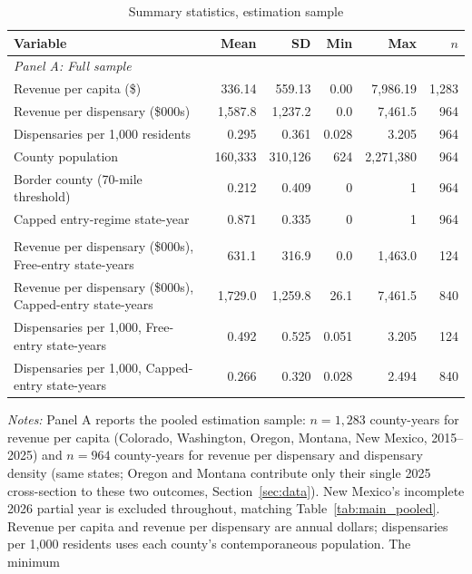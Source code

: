 \begin{table}[htbp]
\centering
\caption{Summary statistics, estimation sample}
\label{tab:summary_stats}
\begin{tabular}{lrrrrr}
\toprule
Variable & Mean & SD & Min & Max & $n$ \\
\midrule
\multicolumn{6}{l}{\textit{Panel A: Full sample}} \\
Revenue per capita (\$) & 336.14 & 559.13 & 0.00 & 7,986.19 & 1,283 \\
Revenue per dispensary (\$000s) & 1,587.8 & 1,237.2 & 0.0 & 7,461.5 & 964 \\
Dispensaries per 1,000 residents & 0.295 & 0.361 & 0.028 & 3.205 & 964 \\
County population & 160,333 & 310,126 & 624 & 2,271,380 & 964 \\
\addlinespace
Border county (70-mile threshold) & 0.212 & 0.409 & 0 & 1 & 964 \\
Capped entry-regime state-year & 0.871 & 0.335 & 0 & 1 & 964 \\
\addlinespace
\multicolumn{6}{l}{\textit{Panel B: By entry regime (revenue-per-store sample)}} \\
\quad Revenue per dispensary (\$000s), Free-entry state-years & 631.1 & 316.9 & 0.0 & 1,463.0 & 124 \\
\quad Revenue per dispensary (\$000s), Capped-entry state-years & 1,729.0 & 1,259.8 & 26.1 & 7,461.5 & 840 \\
\quad Dispensaries per 1,000, Free-entry state-years & 0.492 & 0.525 & 0.051 & 3.205 & 124 \\
\quad Dispensaries per 1,000, Capped-entry state-years & 0.266 & 0.320 & 0.028 & 2.494 & 840 \\
\bottomrule
\end{tabular}
\begin{minipage}{0.95\textwidth}
\vspace{0.4em}
\footnotesize
\textit{Notes:} Panel A reports the pooled estimation sample: $n=1{,}283$ county-years for revenue per
capita (Colorado, Washington, Oregon, Montana, New Mexico, 2015--2025) and $n=964$ county-years for revenue
per dispensary and dispensary density (same states; Oregon and Montana contribute only their single 2025
cross-section to these two outcomes, Section~\ref{sec:data}). New Mexico's incomplete 2026 partial year is
excluded throughout, matching Table~\ref{tab:main_pooled}. Revenue per capita and revenue per dispensary are
annual dollars; dispensaries per 1,000 residents uses each county's contemporaneous population. The minimum

\end{minipage}
\end{table}
